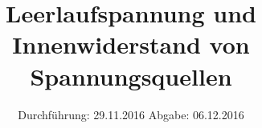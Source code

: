 

\subject{V. 301}
\title{Leerlaufspannung und Innenwiderstand von Spannungsquellen}
\date{
\centering
  Durchführung: 29.11.2016
  \hspace{3em}
  Abgabe: 06.12.2016
}



\maketitle
\thispagestyle{empty}
\tableofcontents
\newpage



%




\printbibliography


